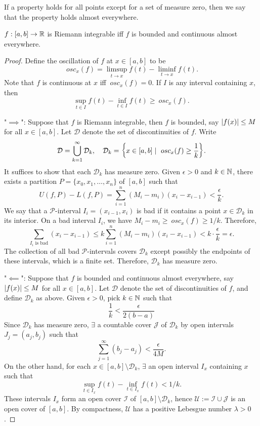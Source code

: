 If a property holds for all points except for a set of measure zero, then we say that the property holds almost everywhere.

\begin{thm}
    $f: [a, b] \to {\mathbb R}$ is Riemann integrable iff $f$ is bounded and continuous almost everywhere.
    \begin{proof}
        Define the oscillation of $f$ at $x \in [a, b]$ to be
        \[
        ~osc _x(f) = \limsup_{t \to x} f(t) - \liminf_{t \to x} f(t).
        \]
        Note that $f$ is continuous at $x$ iff $~osc_x(f) = 0$. If $I$ is any interval containing $x$, then
        \[
        \sup_{t \in I} f(t) - \inf_{t \in I} f(t) \geq ~osc _x(f).
        \]

        "$\implies$": Suppose that $f$ is Riemann integrable, then $f$ is bounded, say ${\left| f(x) \right|} \leq M$ for all $x \in [a, b]$. Let $\mathcal D$ denote the set of discontinuities of $f$. Write
        \[
        \mathcal D = \bigcup_{k=1}^\infty \mathcal D_k, \quad \mathcal D_k = {\left\{{x \in [a, b] \mid ~osc _x(f) \geq \frac1k}\right\}}.
        \]
        It suffices to show that each $\mathcal D_k$ has measure zero. Given $\epsilon > 0$ and $k \in {\mathbb N}$, there exists a partition $P = \{x_0, x_1, \ldots, x_n\}$ of $[a, b]$ such that
        \[
        U(f, P) - L(f, P) = \sum_{i=1}^n (M_i - m_i)(x_i - x_{i-1}) < \frac{\epsilon}{k}.
        \]
        We say that a $\mathcal P$-interval $I_i = (x_{i-1}, x_i)$ is bad if it contains a point $x \in \mathcal D_k$ in its interior. On a bad interval $I_i$, we have $M_i - m_i \geq ~osc_x(f) \geq 1/k$. Therefore,
        \[
        \sum_{I_i \text{ is bad}} (x_i - x_{i-1}) \leq k \sum_{i=1}^n (M_i - m_i)(x_i - x_{i-1}) < k \cdot \frac{\epsilon}{k} = \epsilon.
        \]
        The collection of all bad $\mathcal P$-intervals covers $\mathcal D_k$ except possibly the endpoints of these intervals, which is a finite set. Therefore, $\mathcal D_k$ has measure zero.

        "$\impliedby$": Suppose that $f$ is bounded and continuous almost everywhere, say ${\left| f(x) \right|} \leq M$ for all $x \in [a, b]$. Let $\mathcal D$ denote the set of discontinuities of $f$, and define $\mathcal D_k$ as above. Given $\epsilon > 0$, pick $k \in {\mathbb N}$ such that
        \[
        \frac1k < \frac{\epsilon}{2(b - a)}
        \]
        Since $\mathcal D_k$ has measure zero, $\exists$ a countable cover $\mathcal J$ of $\mathcal D_k$ by open intervals $J_j = (a_j, b_j)$ such that
        \[
        \sum_{j=1}^\infty (b_j - a_j) < \frac{\epsilon}{4M}.
        \]
        On the other hand, for each $x \in [a, b] \setminus \mathcal D_k$, $\exists$ an open interval $I_x$ containing $x$ such that
        \[
        \sup_{t \in I_x} f(t) - \inf_{t \in I_x} f(t) < 1/k.
        \]
        These intervals $I_x$ form an open cover $\mathcal I$ of $[a, b] \setminus \mathcal D_k$, hence $\mathcal U := \mathcal I \cup \mathcal J$ is an open cover of $[a, b]$. By compactness, $\mathcal U$ has a positive Lebesgue number $\lambda > 0$. 
        

\end{proof}
\end{thm}
